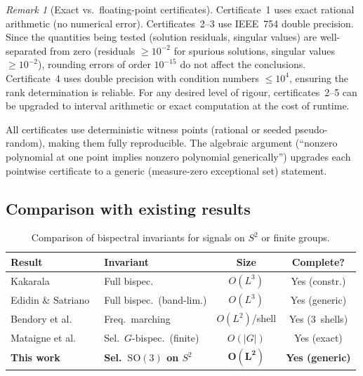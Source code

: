\documentclass{article}
\theoremstyle{definition}
\theoremstyle{remark}
\newtheorem{remark}[theorem]{Remark}
\newcommand{\SO}{\mathrm{SO}}
\theoremstyle{definition}
\begin{document}
\begin{remark}[Exact vs.\ floating-point certificates]
Certificate~1 uses exact rational arithmetic (no numerical error).
Certificates~2--3 use IEEE~754 double precision.
Since the quantities being tested (solution residuals, singular values)
are well-separated from zero (residuals $\ge 10^{-2}$ for spurious
solutions, singular values $\ge 10^{-2}$), rounding errors of order
$10^{-15}$ do not affect the conclusions.
Certificate~4 uses double precision with condition numbers $\le 10^4$,
ensuring the rank determination is reliable.
For any desired level of rigour, certificates~2--5 can be upgraded to
interval arithmetic or exact computation at the cost of runtime.
\end{remark}

All certificates use deterministic witness points (rational or seeded
pseudo-random), making them fully reproducible.
The algebraic argument (``nonzero polynomial at one point implies nonzero
polynomial generically'') upgrades each pointwise certificate to a
generic (measure-zero exceptional set) statement.

\subsection{Comparison with existing results}

\begin{table}[h]
  \caption{Comparison of bispectral invariants for signals on $S^2$ or
    finite groups.}
  \label{tab:app-comparison}
  \centering
  \small
  \setlength{\tabcolsep}{4pt}
  \begin{tabular}{@{}l l c c@{}}
    \toprule
    Result & Invariant & Size & Complete? \\
    \midrule
    Kakarala~\citep{kakarala2012bispectrum}
      & Full bispec. & $O(L^3)$ & Yes (constr.) \\
    Edidin \& Satriano~\citep{edidin2024orbit}
      & Full bispec.\ (band-lim.)
      & $O(L^3)$ & Yes (generic) \\
    Bendory et al.~\citep{bendory2025orbit}
      & Freq.\ marching
      & $O(L^2)$/shell & Yes (3~shells) \\
    Mataigne et al.~\citep{mataigne2024selective}
      & Sel.\ $G$-bispec.\ (finite)
      & $O(|G|)$ & Yes (exact) \\
    \textbf{This work}
      & \textbf{Sel.\ $\SO(3)$ on $S^2$}
      & $\boldsymbol{O(L^2)}$ & \textbf{Yes (generic)} \\
    \bottomrule
  \end{tabular}
\end{table}
\end{document}
